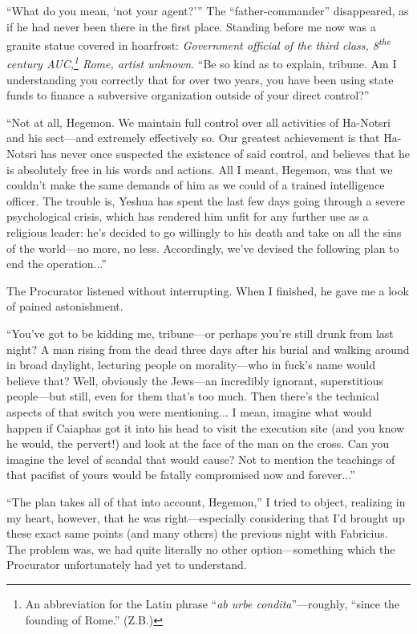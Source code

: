 ``What do you mean, `not your agent?''' The ``father-commander'' disappeared, as if he had never been there in the first place. Standing before me now was a granite statue covered in hoarfrost: \emph{Government official of the third class, 8\textsuperscript{the} century AUC,\footnote{An abbreviation for the Latin phrase ``\emph{ab urbe condita}''---roughly, ``since the founding of Rome.'' (Z.B.)} Rome, artist unknown}. ``Be so kind as to explain, tribune. Am I understanding you correctly that for over two years, you have been using state funds to finance a subversive organization outside of your direct control?''

``Not at all, Hegemon. We maintain full control over all activities of Ha-Notsri and his sect---and extremely effectively so. Our greatest achievement is that Ha-Notsri has never once suspected the existence of said control, and believes that he is absolutely free in his words and actions. All I meant, Hegemon, was that we couldn't make the same demands of him as we could of a trained intelligence officer. The trouble is, Yeshua has spent the last few days going through a severe psychological crisis, which has rendered him unfit for any further use as a religious leader: he's decided to go willingly to his death and take on all the sins of the world---no more, no less. Accordingly, we've devised the following plan to end the operation...''

The Procurator listened without interrupting. When I finished, he gave me a look of pained astonishment.

``You've got to be kidding me, tribune---or perhaps you're still drunk from last night? A man rising from the dead three days after his burial and walking around in broad daylight, lecturing people on morality---who in fuck's name would believe that? Well, obviously the Jews---an incredibly ignorant, superstitious people---but still, even for them that's too much. Then there's the technical aspects of that switch you were mentioning... I mean, imagine what would happen if Caiaphas got it into his head to visit the execution site (and you know he would, the pervert!) and look at the face of the man on the cross. Can you imagine the level of scandal that would cause? Not to mention the teachings of that pacifist of yours would be fatally compromised now and forever...''

``The plan takes all of that into account, Hegemon,'' I tried to object, realizing in my heart, however, that he was right---especially considering that I'd brought up these exact same points (and many others) the previous night with Fabricius. The problem was, we had quite literally no other option---something which the Procurator unfortunately had yet to understand.

